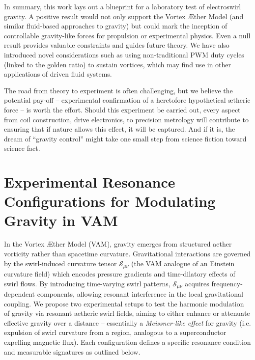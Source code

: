 \documentclass[twocolumn,aps,pre,floatfix,nofootinbib]{revtex4-2}
\begin{document}
In summary, this work lays out a blueprint for a laboratory test of electroswirl gravity. A positive result would not only support the Vortex Æther Model (and similar fluid-based approaches to gravity) but could mark the inception of controllable gravity-like forces for propulsion or experimental physics. Even a null result provides valuable constraints and guides future theory. We have also introduced novel considerations such as using non-traditional PWM duty cycles (linked to the golden ratio) to sustain vortices, which may find use in other applications of driven fluid systems.


The road from theory to experiment is often challenging, but we believe the potential pay-off – experimental confirmation of a heretofore hypothetical ætheric force – is worth the effort. Should this experiment be carried out, every aspect from coil construction, drive electronics, to precision metrology will contribute to ensuring that if nature allows this effect, it will be captured. And if it is, the dream of “gravity control” might take one small step from science fiction toward science fact.













\appendix
\section{Experimental Resonance Configurations for Modulating Gravity in VAM}

In the Vortex Æther Model (VAM), gravity emerges from structured aether vorticity rather than spacetime curvature. Gravitational interactions are governed by the swirl-induced curvature tensor \(\mathcal{S}_{\mu\nu}\) (the VAM analogue of an Einstein curvature field) which encodes pressure gradients and time-dilatory effects of swirl flows. By introducing time-varying swirl patterns, $\mathcal{S}_{\mu\nu}$ acquires frequency-dependent components, allowing resonant interference in the local gravitational coupling. We propose two experimental setups to test the harmonic modulation of gravity via resonant aetheric swirl fields, aiming to either enhance or attenuate effective gravity over a distance – essentially a \textit{Meissner-like effect} for gravity (i.e. expulsion of swirl curvature from a region, analogous to a superconductor expelling magnetic flux). Each configuration defines a specific resonance condition and measurable signatures as outlined below.
\end{document}
